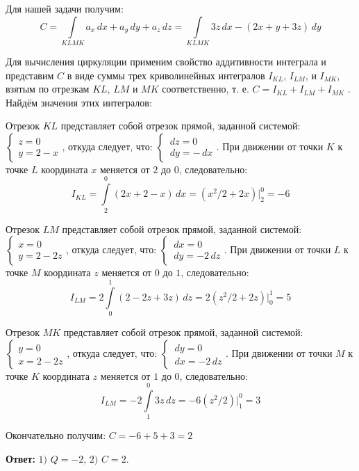\documentclass[12pt]{article}
\begin{document}
\begin{enumerate}[wide, labelwidth=!, labelindent=0pt]
		Для нашей задачи получим:
		$$ C = \int \limits_{KLMK} a_x \,d x + a_y \,d y + a_z \,d z = \int \limits_{KLMK} 3z \,d x - (2x+y+3z)\,dy $$		
		
		Для вычисления циркуляции применим свойство аддитивности интеграла и представим $ C $ в виде суммы трех криволинейных интегралов $ I_{KL} $, $ I_{LM} $, и $ I_{MK} $, взятым по отрезкам $ KL $, $ LM $ и $ MK $ соответственно, т. е. $ C =  I_{KL} + I_{LM} + I_{MK} $ . Найдём значения этих интегралов:
		
		Отрезок $ KL $ представляет собой отрезок прямой, заданной системой:\\
		$\begin{cases}
			z=0\\
			y=2-x
		\end{cases}$, откуда следует, что:
		$\begin{cases}
			\,dz=0\\
			\,dy=-\,dx
		\end{cases}$.  При движении от точки $ K $ к точке $ L $ координата $ x $ меняется от $ 2 $ до $ 0 $, следовательно:
		$$ I_{KL} = \int \limits_{2}^{0} (2x+2-x)\,dx  = (x^2/2+2x)\Big|_{2}^{0} = -6$$
		
		Отрезок $ LM $ представляет собой отрезок прямой, заданной системой:\\
		$\begin{cases}
		x=0\\
		y=2-2z
		\end{cases}$, откуда следует, что:
		$\begin{cases}
		\,dx=0\\
		\,dy=-2\,dz
		\end{cases}$.  При движении от точки $ L $ к точке $ M $ координата $ z $ меняется от $ 0 $ до $ 1 $, следовательно:
		$$ I_{LM} = 2\int \limits_{0}^{1} (2-2z+3z)\,dz  = 2(z^2/2+2z)\Big|_{0}^{1} = 5$$
		
		Отрезок $ MK $ представляет собой отрезок прямой, заданной системой:\\
		$\begin{cases}
		y=0\\
		x=2-2z
		\end{cases}$, откуда следует, что:
		$\begin{cases}
		\,dy=0\\
		\,dx=-2\,dz
		\end{cases}$.  При движении от точки $ M $ к точке $ K $ координата $ z $ меняется от $ 1 $ до $ 0 $, следовательно:
		$$ I_{LM} = -2\int \limits_{1}^{0}  3z \,d z = -6(z^2/2)\Big|_{1}^{0} = 3$$
		
		Окончательно получим: $ C = -6 + 5 + 3  = 2$
		
		\hspace{290pt}\textbf{Ответ:} $\text{1) } Q = -2\text{, 2) } C = 2.$	
	\end{enumerate}
\end{document}
